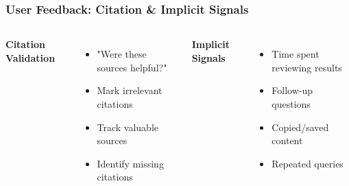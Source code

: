\begin{frame}
    \frametitle{User Feedback: Citation \& Implicit Signals}
    
    \begin{columns}
        \textbf{Citation Validation}
        \begin{itemize}
            \item "Were these sources helpful?"
            \item Mark irrelevant citations
            \item Track valuable sources
            \item Identify missing citations
        \end{itemize}
        
        \textbf{Implicit Signals}
        \begin{itemize}
            \item Time spent reviewing results
            \item Follow-up questions
            \item Copied/saved content
            \item Repeated queries
        \end{itemize}
    \end{columns}
    
    \begin{center}
    \end{center}
\end{frame}

